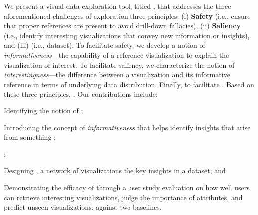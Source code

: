  \par
We present a visual data exploration tool, titled \system,
 that addresses the three aforementioned
 challenges of exploration 
 three principles:
 (i) \textbf{Safety}
 (i.e., ensure that proper
 references are present to
 avoid drill-down fallacies),
 (ii) \textbf{Saliency}
 (i.e., identify interesting visualizations
 that convey new information or insights),
 and (iii) 
 (i.e.,  dataset).
 To facilitate safety, we develop a
 notion of \emph{informativeness}---the capability
 of a reference 
 visualization to explain the visualization of interest.
 To facilitate saliency,
 we characterize the notion of \emph{interestingness}---the
 difference between a visualization and
 its informative reference
 in terms of underlying data distribution.
 Finally, to facilitate .
 Based on these three principles,
 .
 Our contributions include:
\begin{denselist}
\item Identifying 
the notion of ;
\item Introducing the concept of \emph{informativeness}
that helps identify insights
that arise from something
;
\item {};
\item Designing \system,
 a network of visualizations 
 the key insights in a dataset; and
\item Demonstrating the efficacy of \change{\system} through a user study evaluation on how well users can retrieve interesting visualizations, judge the importance of attributes, and predict unseen visualizations, against two baselines.
\end{denselist}
